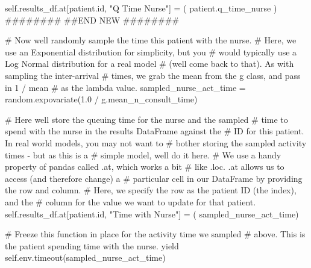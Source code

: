 \documentclass[
  letterpaper,
  DIV=11,
  numbers=noendperiod]{scrreprt}
\newenvironment{Shaded}{}{}
\newcommand{\BuiltInTok}[1]{\textcolor[rgb]{0.84,0.23,0.29}{#1}}
\newcommand{\CommentTok}[1]{\textcolor[rgb]{0.42,0.45,0.49}{#1}}
\newcommand{\ControlFlowTok}[1]{\textcolor[rgb]{0.84,0.23,0.29}{#1}}
\newcommand{\FloatTok}[1]{\textcolor[rgb]{0.00,0.36,0.77}{#1}}
\newcommand{\NormalTok}[1]{\textcolor[rgb]{0.14,0.16,0.18}{#1}}
\newcommand{\OperatorTok}[1]{\textcolor[rgb]{0.14,0.16,0.18}{#1}}
\newcommand{\RegionMarkerTok}[1]{\textcolor[rgb]{0.42,0.45,0.49}{#1}}
\newcommand{\StringTok}[1]{\textcolor[rgb]{0.01,0.18,0.38}{#1}}
\newcommand{\VariableTok}[1]{\textcolor[rgb]{0.89,0.38,0.04}{#1}}
\begin{document}
\begin{tcolorbox}
\begin{Shaded}
\begin{Highlighting}[]
        \VariableTok{self}\NormalTok{.results\_df.at[patient.}\BuiltInTok{id}\NormalTok{, }\StringTok{"Q Time Nurse"}\NormalTok{] }\OperatorTok{=}\NormalTok{ (}
\NormalTok{          patient.q\_time\_nurse}
\NormalTok{        )}
        \CommentTok{\#\#\#\#\#\#\#\#}
        \CommentTok{\#\#}\RegionMarkerTok{END}\CommentTok{ NEW}
        \CommentTok{\#\#\#\#\#\#\#\#}

        \CommentTok{\# Now we\textquotesingle{}ll randomly sample the time this patient with the nurse.}
        \CommentTok{\# Here, we use an Exponential distribution for simplicity, but you}
        \CommentTok{\# would typically use a Log Normal distribution for a real model}
        \CommentTok{\# (we\textquotesingle{}ll come back to that).  As with sampling the inter{-}arrival}
        \CommentTok{\# times, we grab the mean from the g class, and pass in 1 / mean}
        \CommentTok{\# as the lambda value.}
\NormalTok{        sampled\_nurse\_act\_time }\OperatorTok{=}\NormalTok{ random.expovariate(}\FloatTok{1.0} \OperatorTok{/}
\NormalTok{                                                    g.mean\_n\_consult\_time)}

        \CommentTok{\# Here we\textquotesingle{}ll store the queuing time for the nurse and the sampled}
        \CommentTok{\# time to spend with the nurse in the results DataFrame against the}
        \CommentTok{\# ID for this patient.  In real world models, you may not want to}
        \CommentTok{\# bother storing the sampled activity times {-} but as this is a}
        \CommentTok{\# simple model, we\textquotesingle{}ll do it here.}
        \CommentTok{\# We use a handy property of pandas called .at, which works a bit}
        \CommentTok{\# like .loc.  .at allows us to access (and therefore change) a}
        \CommentTok{\# particular cell in our DataFrame by providing the row and column.}
        \CommentTok{\# Here, we specify the row as the patient ID (the index), and the}
        \CommentTok{\# column for the value we want to update for that patient.}
        \VariableTok{self}\NormalTok{.results\_df.at[patient.}\BuiltInTok{id}\NormalTok{, }\StringTok{"Time with Nurse"}\NormalTok{] }\OperatorTok{=}\NormalTok{ (}
\NormalTok{            sampled\_nurse\_act\_time)}

        \CommentTok{\# Freeze this function in place for the activity time we sampled}
        \CommentTok{\# above.  This is the patient spending time with the nurse.}
        \ControlFlowTok{yield} \VariableTok{self}\NormalTok{.env.timeout(sampled\_nurse\_act\_time)}


\end{Highlighting}
\end{Shaded}
\end{tcolorbox}
\end{document}

